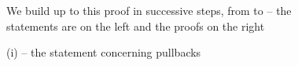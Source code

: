         \begin{figure}[h!]
            \centering
            \begin{minipage}[t]{0.73\textwidth}
                \vspace{0pt}
                \caption{(i) -- the statement concerning pullbacks}\label{fg:stability}
            \end{minipage}
            \hfill
            \begin{minipage}[t]{0.23\textwidth}
                \vspace{0pt}
                {\footnotesize We build up to this proof in successive steps, from  to  -- the statements are on the left and the proofs on the right}
            \end{minipage}
        \end{figure}




